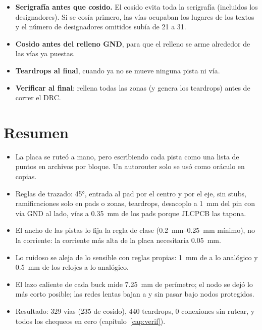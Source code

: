 \begin{itemize}
  \item \textbf{Serigrafía antes que cosido.} El cosido evita toda la serigrafía (incluidos los designadores). Si se
  cosía primero, las vías ocupaban los lugares de los textos y el número de designadores omitidos subía de 21 a 31.
  \item \textbf{Cosido antes del relleno GND}, para que el relleno se arme alrededor de las vías ya puestas.
  \item \textbf{Teardrops al final}, cuando ya no se mueve ninguna pista ni vía.
  \item \textbf{Verificar al final}: rellena todas las zonas (y genera los teardrops) antes de correr el DRC.
\end{itemize}

\section*{Resumen}
\begin{itemize}
  \item La placa se ruteó a mano, pero escribiendo cada pista como una lista de puntos en archivos por bloque. Un
  autorouter solo se usó como oráculo en copias.
  \item Reglas de trazado: \ang{45}, entrada al pad por el centro y por el eje, sin stubs, ramificaciones solo en pads o
  zonas, teardrops, desacoplo a \SI{1}{\milli\meter} del pin con vía GND al lado, vías a \SI{0.35}{\milli\meter} de los
  pads porque JLCPCB las tapona.
  \item El ancho de las pistas lo fija la regla de clase (\SIrange{0.2}{0.25}{\milli\meter} mínimo), no la corriente:
  la corriente más alta de la placa necesitaría \SI{0.05}{\milli\meter}.
  \item Lo ruidoso se aleja de lo sensible con reglas propias: \SI{1}{\milli\meter} de  a lo analógico y
  \SI{0.5}{\milli\meter} de los relojes a lo analógico.
  \item El lazo caliente de cada buck mide \SI{7.25}{\milli\meter} de perímetro; el nodo  se dejó lo más corto
  posible; las redes lentas bajan a  y  sin pasar bajo nodos protegidos.
  \item Resultado: 329 vías (235 de cosido), 440 teardrops, 0 conexiones sin rutear, y todos los chequeos en cero
  (capítulo~\ref{cap:verif}).
\end{itemize}
